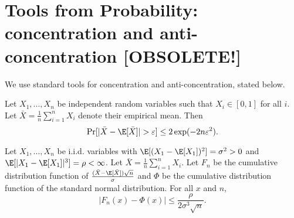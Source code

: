 \section{Tools from Probability: concentration and anti-concentration [OBSOLETE!]}
\label{sec:prelim}

We use standard tools for concentration and anti-concentration, stated below.

\begin{theorem}\label{thm:prelims-chernoff}
Let $X_1,...,X_n$  be independent random variables such that $X_i \in [0,1]$ for all $i$. Let $\bar{X} = \frac{1}{n}\sum_{i=1}^n X_i$ denote their empirical mean. Then
\[
\Pr[ |\bar{X} - \E[\bar{X}]| > \varepsilon] \leq 2\exp(-2n\varepsilon^2).
\]
\end{theorem}

\begin{theorem}\label{thm:prelims-Berry}
Let $X_1,...,X_n$ be i.i.d. variables with $\E[ (X_1 - \E[X_1])^2] = \sigma^2 >0$ and $\E[ |X_1 - \E[X_1]|^3] =\rho <\infty$. Let $\bar{X} = \frac{1}{n} \sum_{i=1}^n X_i$. Let $F_n$ be the cumulative distribution function of $\frac{(\bar{X} - \E[\bar{X}]) \sqrt{n}}{\sigma}$ and $\Phi$ be the cumulative distribution function of the standard normal distribution. For all $x$ and $n$,
\[
|F_n(x) - \Phi(x) | \leq \frac{\rho}{2\sigma^3\sqrt{n}}.
\]
\end{theorem}



